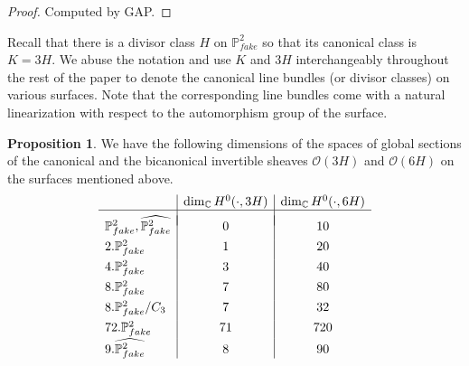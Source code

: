 \documentclass[11pt,reqno]{amsart}
\def\OO{{\mathcal O}}
\def\C {{\mathbb C}}
\def\P {{\mathbb P}}
\def\FPP {{\P^2_{fake}}}
\theoremstyle{definition}
\newtheorem{proposition}[theorem]{Proposition}
\numberwithin{equation}{section}
\begin{document}
\begin{proof}
Computed by GAP.
\end{proof}

Recall that there is a divisor class $H$ on $\FPP$ so that its canonical class is $K=3H$. We abuse the notation and use $K$ and $3H$ interchangeably throughout the rest of the paper to denote the canonical line bundles (or divisor classes) on various surfaces. Note that the corresponding line bundles come with a natural linearization with respect to the automorphism group of the surface.

\begin{proposition}\label{2.2}
We have the following dimensions of the spaces of global sections of the canonical and the bicanonical invertible sheaves $\OO(3H)$ and $\OO(6H)$ on the surfaces mentioned above. 
$$
\begin{array}{l|c|c}
&\dim_\C H^0(\cdot, 3H)& \dim_\C H^0(\cdot, 6H)\\
\hline&&\\[-.8em]
\FPP,\widehat\FPP& 0 & 10 \\[.4em]
2.\FPP & 1 & 20 \\[.4em]
4.\FPP & 3 & 40 \\[.4em]
8.\FPP & 7 & 80 \\[.4em]
8.\FPP/C_3 & 7 & 32\\[.4em]
72.\FPP & 71 & 720 \\[.2em]
9.\widehat\FPP & 8 & 90 
\end{array}
$$
\end{proposition}
\end{document}
